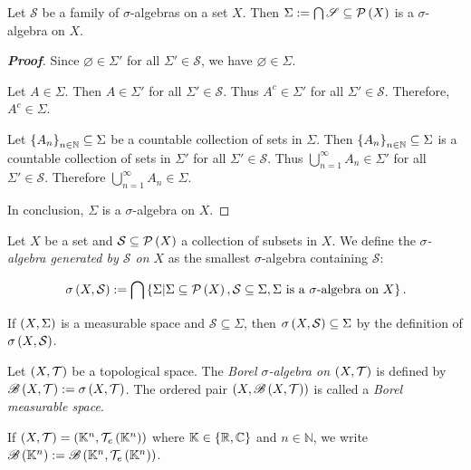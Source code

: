 \begin{proposition}
  Let $\mathscr{S}$ be a family of $\sigma$-algebras on a set $X$. Then $\Sigma:=\bigcap{\mathscr{S}}\subseteq\mathcal{P}\left(X\right)$ is a $\sigma$-algebra on $X$.
  \begin{proof}[\rm\textbf{Proof}]
    Since $\varnothing\in\Sigma'$ for all $\Sigma'\in\mathscr{S}$, we have $\varnothing\in\Sigma$. 
    
    Let $A\in\Sigma$. Then $A\in\Sigma'$ for all $\Sigma'\in\mathscr{S}$. Thus $A^c\in\Sigma'$ for all $\Sigma'\in\mathscr{S}$. Therefore, $A^c\in\Sigma$. 
    
    Let $\left\{A_n\right\}_{n\in\mathbb{N}}\subseteq\Sigma$ be a countable collection of sets in $\Sigma$. Then $\left\{A_n\right\}_{n\in\mathbb{N}}\subseteq\Sigma$ is a countable collection of sets in $\Sigma'$ for all $\Sigma'\in\mathscr{S}$. Thus $\bigcup_{n=1}^{\infty}{A_n}\in\Sigma'$ for all $\Sigma'\in\mathscr{S}$. Therefore $\bigcup_{n=1}^{\infty}{A_n}\in\Sigma$.

    In conclusion, $\Sigma$ is a $\sigma$-algebra on $X$.
  \end{proof}
\end{proposition}

\begin{definition}
  Let $X$ be a set and $\mathcal{S}\subseteq\mathcal{P}\left(X\right)$ a collection of subsets in $X$. We define the \emph{$\sigma$-algebra generated by $\mathcal{S}$ on $X$} as the smallest $\sigma$-algebra containing $\mathcal{S}$:

  \begin{equation}
    \sigma\left(X,\mathcal{S}\right):=\bigcap\left\{\Sigma\middle|\Sigma\subseteq\mathcal{P}\left(X\right),\mathcal{S}\subseteq\Sigma, \Sigma\text{ is a $\sigma$-algebra on $X$}\right\}.
  \end{equation}
\end{definition}

\begin{remark}
  If $\left(X,\Sigma\right)$ is a measurable space and $\mathcal{S}\subseteq\Sigma$, then $\sigma\left(X,\mathcal{S}\right)\subseteq\Sigma$ by the definition of $\sigma\left(X,\mathcal{S}\right)$.
\end{remark}

\begin{definition}
  Let $\left(X,\mathcal{T}\right)$ be a topological space. The \emph{Borel $\sigma$-algebra on $\left(X,\mathcal{T}\right)$} is defined by $\mathscr{B}\left(X,\mathcal{T}\right):=\sigma\left(X,\mathcal{T}\right)$. The ordered pair $\left(X,\mathscr{B}\left(X,\mathcal{T}\right)\right)$ is called a \emph{Borel measurable space}.

  If $\left(X,\mathcal{T}\right)=\left(\mathbb{K}^n,\mathcal{T}_e\left(\mathbb{K}^n\right)\right)$ where $\mathbb{K}\in\left\{\mathbb{R},\mathbb{C}\right\}$ and $n\in\mathbb{N}$, we write $\mathscr{B}\left(\mathbb{K}^n\right):=\mathscr{B}\left(\mathbb{K}^n,\mathcal{T}_e\left(\mathbb{K}^n\right)\right)$.
\end{definition}

